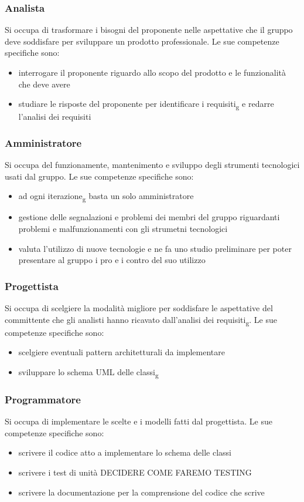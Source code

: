 \subsubsection{Analista}
Si occupa di trasformare i bisogni del proponente nelle aspettative che il gruppo deve soddisfare per sviluppare un prodotto professionale. Le sue competenze specifiche sono:
\begin{itemize}
	\item interrogare il proponente riguardo allo scopo del prodotto e le funzionalità che deve avere
	\item studiare le risposte del proponente per identificare i requisiti\textsubscript{g} e redarre l'analisi dei requisiti
\end{itemize}

\subsubsection{Amministratore}
Si occupa del funzionamente, mantenimento e sviluppo degli strumenti tecnologici usati dal gruppo. Le sue competenze specifiche sono:
\begin{itemize}
	\item ad ogni iterazione\textsubscript{g} basta un solo amministratore
	\item gestione delle segnalazioni e problemi dei membri del gruppo riguardanti problemi e malfunzionamenti con gli strumetni tecnologici
	\item valuta l'utilizzo di nuove tecnologie e ne fa uno studio preliminare per poter presentare al gruppo i pro e i contro del suo utilizzo
\end{itemize}

\subsubsection{Progettista}
Si occupa di scelgiere la modalità migliore per soddisfare le aspettative del committente che gli analisti hanno ricavato dall'analisi dei requisiti\textsubscript{g}. Le sue competenze specifiche sono:
\begin{itemize}
	\item scelgiere eventuali pattern architetturali da implementare
	\item sviluppare lo schema UML delle classi\textsubscript{g}
\end{itemize}

\subsubsection{Programmatore}
Si occupa di implementare le scelte e i modelli fatti dal progettista. Le sue competenze specifiche sono:
\begin{itemize}
	\item scrivere il codice atto a implementare lo schema delle classi
	\item scrivere i test di unità DECIDERE COME FAREMO TESTING
	\item scrivere la documentazione per la comprensione del codice che scrive
\end{itemize}


